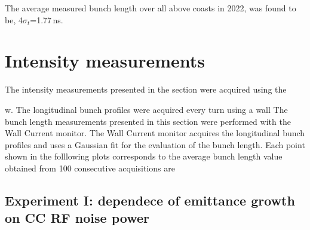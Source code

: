The average measured bunch length over all above coasts in 2022, was found to be, 4$\sigma_t$=1.77\,ns. 



 \section{Intensity measurements}\label{sec:intensity_meas_2022}

 The intensity measurements presented in the section were acquired using the 



 w. The longitudinal bunch profiles were acquired every turn using a wall
 The bunch length measurements presented in this section were performed with the Wall Current monitor. The Wall Current monitor acquires the longitudinal bunch profiles and uses a Gaussian fit for the evaluation of the bunch length. Each point shown in the folllowing plots corresponds to the average bunch length value obtained from 100 consecutive acquisitions are  


 \subsection{Experiment I: dependece of emittance growth on CC RF noise power}\label{subsec:2022_exp1_intensity}

